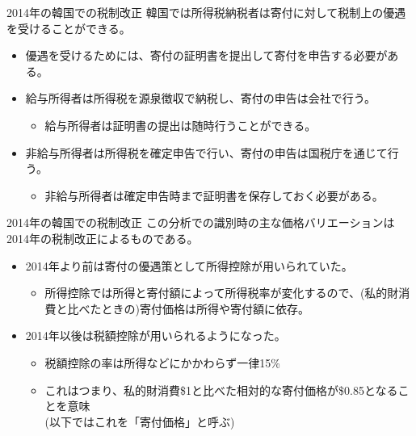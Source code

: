 \documentclass[dvipdfmx,10pt]{beamer}
\begin{document}
	\begin{frame}{2014年の韓国での税制改正}
		\protect\hypertarget{tax-reform-in-south-korea}{}
		韓国では所得税納税者は寄付に対して税制上の優遇を受けることができる。
		\begin{itemize}
			\item 優遇を受けるためには、寄付の証明書を提出して寄付を申告する必要がある。
			\item 給与所得者は所得税を源泉徴収で納税し、寄付の申告は会社で行う。
			\begin{itemize}
				\item 給与所得者は証明書の提出は随時行うことができる。
			\end{itemize}
			\item 非給与所得者は所得税を確定申告で行い、寄付の申告は国税庁を通じて行う。			
			\begin{itemize}
				\item 非給与所得者は確定申告時まで証明書を保存しておく必要がある。
			\end{itemize}
		\end{itemize}
	\end{frame}
	
	\begin{frame}{2014年の韓国での税制改正}
		\protect\hypertarget{tax-reform-in-south-korea-1}{}
		この分析での識別時の主な価格バリエーションは2014年の税制改正によるものである。		
		\begin{itemize}
			\item 2014年より前は寄付の優遇策として所得控除が用いられていた。			
			\begin{itemize}
				\item 所得控除では所得と寄付額によって所得税率が変化するので、(私的財消費と比べたときの)寄付価格は所得や寄付額に依存。
			\end{itemize}
			\item 2014年以後は税額控除が用いられるようになった。
			\begin{itemize}
				\item 税額控除の率は所得などにかかわらず一律15\%
				\item これはつまり、私的財消費\$1と比べた相対的な寄付価格が\$0.85となることを意味\\
				(以下ではこれを「寄付価格」と呼ぶ)
			\end{itemize}
		\end{itemize}
	\end{frame}
	
\end{document}

